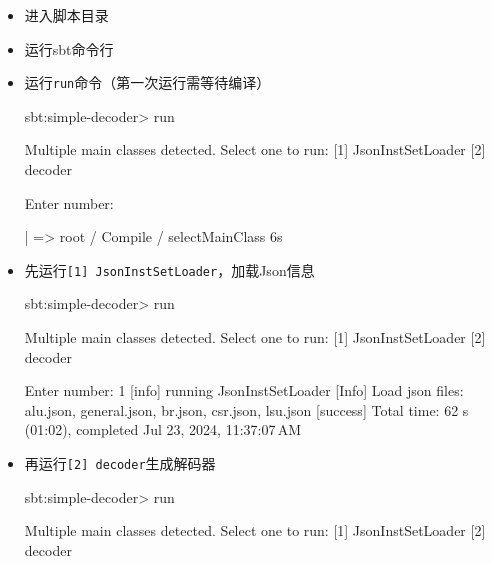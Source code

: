 \begin{itemize}
\item
  进入脚本目录
\item
  运行sbt命令行

\item
  运行\texttt{run}命令（第一次运行需等待编译）

\begin{CodeBlock}[language=BookText]
sbt:simple-decoder> run

Multiple main classes detected. Select one to run:
 [1] JsonInstSetLoader
 [2] decoder

Enter number:

  | => root / Compile / selectMainClass 6s

\end{CodeBlock}
\item
  先运行\texttt{{[}1{]}\ JsonInstSetLoader}，加载Json信息

\begin{CodeBlock}[language=BookText]
sbt:simple-decoder> run

Multiple main classes detected. Select one to run:
 [1] JsonInstSetLoader
 [2] decoder

Enter number: 1
[info] running JsonInstSetLoader
[Info] Load json files: alu.json, general.json, br.json, csr.json, lsu.json
[success] Total time: 62 s (01:02), completed Jul 23, 2024, 11:37:07 AM
\end{CodeBlock}
\item
  再运行\texttt{{[}2{]}\ decoder}生成解码器

\begin{CodeBlock}[language=BookText]
sbt:simple-decoder> run

Multiple main classes detected. Select one to run:
 [1] JsonInstSetLoader
 [2] decoder


\end{CodeBlock}
\end{itemize}
